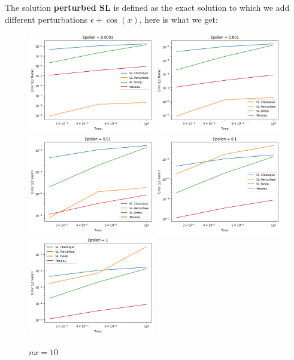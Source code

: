 \documentclass{article}
\begin{document}
The solution \textbf{perturbed SL} is defined as the exact solution to which we add different perturbations $\epsilon + \cos(x)$, here is what we get:\\

\begin{figure}[!h]
    \centering
    \includegraphics[width=0.49\textwidth]{images/10ep21.png}
    \includegraphics[width=0.49\textwidth]{images/10ep22.png}
    \includegraphics[width=0.49\textwidth]{images/10ep23.png}
    \includegraphics[width=0.49\textwidth]{images/10ep24.png}
    \includegraphics[width=0.49\textwidth]{images/10ep25.png}
    \caption{$nx = 10$}
\end{figure}
\end{document}
